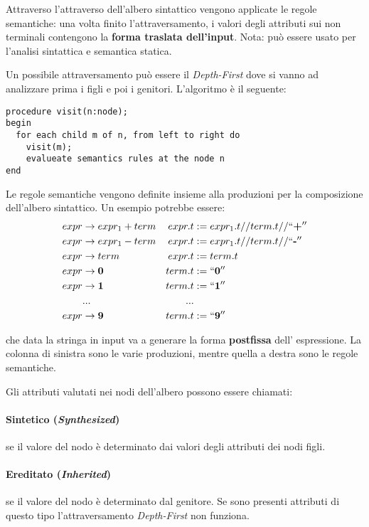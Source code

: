 Attraverso l'attraverso dell'albero sintattico vengono applicate le regole
semantiche: una volta finito l'attraversamento, i valori degli attributi sui non
terminali contengono la \textbf{forma traslata dell'input}. Nota: può essere
usato per l'analisi sintattica e semantica statica.

Un possibile attraversamento può essere il \textit{Depth-First} dove si vanno
ad analizzare prima i figli e poi i genitori. L'algoritmo è il seguente:

\begin{lstlisting}[frame=single]
procedure visit(n:node);
begin
  for each child m of n, from left to right do
    visit(m);
    evalueate semantics rules at the node n
end
\end{lstlisting}

Le regole semantiche vengono definite insieme alla produzioni per la
composizione dell'albero sintattico. Un esempio potrebbe essere:
\begin{align*}
expr &\to expr_1 + term  & expr.t &:= expr_1.t // term.t // ``\textbf{+}''  \\
expr &\to expr_1 - term  & expr.t &:= expr_1.t // term.t // ``\textbf{-}''  \\
expr &\to term           & expr.t &:= term.t                                \\
expr &\to \textbf{0}     & term.t &:= ``\textbf{0}''                        \\
expr &\to \textbf{1}     & term.t &:= ``\textbf{1}''                        \\
     &...                & ...                                              \\
expr &\to \textbf{9}     & term.t &:= ``\textbf{9}''
\end{align*}

che data la stringa in input va a generare la forma \textbf{postfissa} dell'
espressione. La colonna di sinistra sono le varie produzioni, mentre quella a
destra sono le regole semantiche.

Gli attributi valutati nei nodi dell'albero possono essere chiamati:

\paragraph{Sintetico (\textit{Synthesized})}
se il valore del nodo è determinato dai valori degli attributi dei nodi figli.
\paragraph{Ereditato (\textit{Inherited})}
se il valore del nodo è determinato dal genitore. Se sono presenti attributi di
questo tipo l'attraversamento \textit{Depth-First} non funziona.

